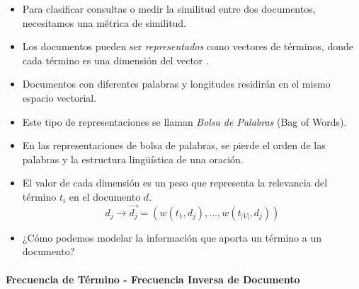 \documentclass{book}
\begin{document}
\begin{itemize}
\item Para clasificar consultas o medir la similitud entre dos documentos, necesitamos una métrica de similitud.
\item Los documentos pueden ser \textit{representados} como vectores de términos, donde cada término es una dimensión del vector \cite{salton1975vector}.
\item Documentos con diferentes palabras y longitudes residirán en el mismo espacio vectorial.
\item Este tipo de representaciones se llaman \emph{Bolsa de Palabras} (Bag of Words).
\item En las representaciones de bolsa de palabras, se pierde el orden de las palabras y la estructura lingüística de una oración.
\item El valor de cada dimensión es un peso que representa la relevancia del término $t_{i}$ en el documento $d$.
\begin{equation}
d_{j} \rightarrow \overrightarrow{d_{j}}=(w(t_{1},d_{j}),...,w(t_{|V|},d_{j}))
\end{equation}
\item ¿Cómo podemos modelar la información que aporta un término a un documento?
\end{itemize}

\paragraph{Frecuencia de Término - Frecuencia Inversa de Documento}
\end{document}
